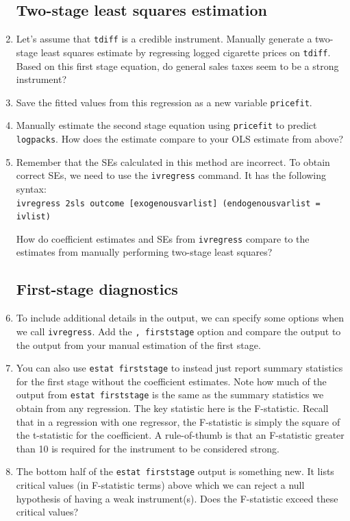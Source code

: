 \documentclass[a4paper,12pt]{article}
\begin{document}
\begin{enumerate}
\subsection*{Two-stage least squares estimation}

\item Let's assume that \texttt{tdiff} is a credible instrument. Manually generate a two-stage least squares estimate by regressing logged cigarette prices on \texttt{tdiff}. Based on this first stage equation, do general sales taxes seem to be a strong instrument?
\item Save the fitted values from this regression as a new variable \texttt{pricefit}.
\item Manually estimate the second stage equation using \texttt{pricefit} to predict \texttt{logpacks}. How does the estimate compare to your OLS estimate from above?
\item Remember that the SEs calculated in this method are incorrect. To obtain correct SEs, we need to use the \texttt{ivregress} command. It has the following syntax:\\
\texttt{ivregress 2sls outcome [exogenousvarlist] (endogenousvarlist = ivlist)}

How do coefficient estimates and SEs from \texttt{ivregress} compare to the estimates from manually performing two-stage least squares?

\subsection*{First-stage diagnostics}

\item To include additional details in the output, we can specify some options when we call \texttt{ivregress}. Add the \texttt{, firststage} option and compare the output to the output from your manual estimation of the first stage.
\item You can also use \texttt{estat firststage} to instead just report summary statistics for the first stage without the coefficient estimates. Note how much of the output from \texttt{estat firststage} is the same as the summary statistics we obtain from any regression. The key statistic here is the F-statistic. Recall that in a regression with one regressor, the F-statistic is simply the square of the t-statistic for the coefficient. A rule-of-thumb is that an F-statistic greater than 10 is required for the instrument to be considered strong.
\item The bottom half of the \texttt{estat firststage} output is something new. It lists critical values (in F-statistic terms) above which we can reject a null hypothesis of having a weak instrument(s). Does the F-statistic exceed these critical values?


\end{enumerate}
\end{document}
